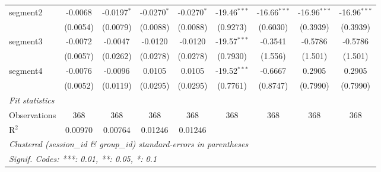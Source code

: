 \begin{tabular}{lcccccccc}
   segment2               & -0.0068       & -0.0197$^{*}$ & -0.0270$^{*}$ & -0.0270$^{*}$ & -19.46$^{***}$ & -16.66$^{***}$ & -16.96$^{***}$ & -16.96$^{***}$\\   
                          & (0.0054)      & (0.0079)      & (0.0088)      & (0.0088)      & (0.9273)       & (0.6030)       & (0.3939)       & (0.3939)\\   
   segment3               & -0.0072       & -0.0047       & -0.0120       & -0.0120       & -19.57$^{***}$ & -0.3541        & -0.5786        & -0.5786\\   
                          & (0.0057)      & (0.0262)      & (0.0278)      & (0.0278)      & (0.7930)       & (1.556)        & (1.501)        & (1.501)\\   
   segment4               & -0.0076       & -0.0096       & 0.0105        & 0.0105        & -19.52$^{***}$ & -0.6667        & 0.2905         & 0.2905\\   
                          & (0.0052)      & (0.0119)      & (0.0295)      & (0.0295)      & (0.7761)       & (0.8747)       & (0.7990)       & (0.7990)\\   
   \midrule
   \emph{Fit statistics}\\
   Observations           & 368           & 368           & 368           & 368           & 368            & 368            & 368            & 368\\  
   R$^2$                  & 0.00970       & 0.00764       & 0.01246       & 0.01246       &                &                &                & \\  
   \midrule \midrule
   \multicolumn{9}{l}{\emph{Clustered (session\_id \& group\_id) standard-errors in parentheses}}\\
   \multicolumn{9}{l}{\emph{Signif. Codes: ***: 0.01, **: 0.05, *: 0.1}}\\
\end{tabular}
\par\endgroup
